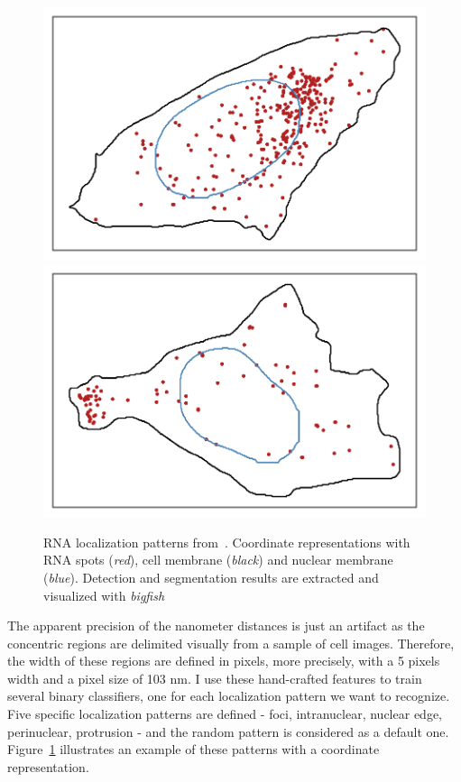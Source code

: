 \begin{figure}[h]
	\endminipage\hfill
		\includegraphics[trim={0.5cm 0.5cm 0.5cm 0.5cm},clip,width=\linewidth]{figures/chapter5/plot_perinuclear}
	\endminipage\hfill
		\includegraphics[trim={0.5cm 0.5cm 0.5cm 0.5cm},clip,width=\linewidth]{figures/chapter5/plot_protrusion}
	\endminipage
	\caption{RNA localization patterns from~\cite{CHOUAIB_2020}.
	Coordinate representations with RNA spots (\textit{red}), cell membrane (\textit{black}) and nuclear membrane (\textit{blue}).
	Detection and segmentation results are extracted and visualized with \emph{bigfish}}
	\label{fig:localization_patterns_racha_features}
\end{figure}

The apparent precision of the nanometer distances is just an artifact as the concentric regions are delimited visually from a sample of cell images.
Therefore, the width of these regions are defined in pixels, more precisely, with a 5 pixels width and a pixel size of 103 nm.
I use these hand-crafted features to train several binary classifiers, one for each localization pattern we want to recognize.
Five specific localization patterns are defined - foci, intranuclear, nuclear edge, perinuclear, protrusion - and the random pattern is considered as a default one.
Figure~\ref{fig:localization_patterns_racha_features} illustrates an example of these patterns with a coordinate representation.

